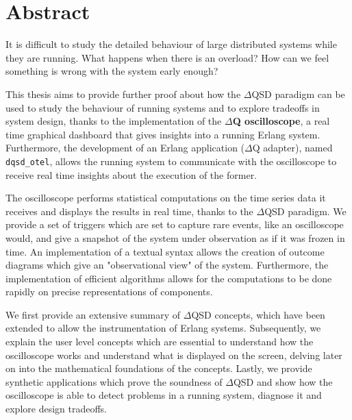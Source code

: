 \chapter*{Abstract}
    It is difficult to study the detailed behaviour of large distributed systems while they are running. What happens when there is an overload? How can we feel something is wrong with the system early enough?

    This thesis aims to provide further proof about how the $\Delta$QSD paradigm can be used to study the behaviour of running systems and to explore tradeoffs in system design, thanks to the implementation of the \textbf{$\Delta$Q oscilloscope}, a real time graphical dashboard that gives insights into a running Erlang system. Furthermore, the development of an Erlang application ($\Delta$Q adapter), named \texttt{dqsd\_otel}, allows the running system to communicate with the oscilloscope to receive real time insights about the execution of the former.
    
    The oscilloscope performs statistical computations on the time series data it receives and displays the results in real time, thanks to the $\Delta$QSD paradigm. We provide a set of triggers which are set to capture rare events, like an oscilloscope would, and give a snapshot of the system under observation as if it was frozen in time. An implementation of a textual syntax allows the creation of outcome diagrams which give an "observational view" of the system. Furthermore, the implementation of efficient algorithms allows for the computations to be done rapidly on precise representations of components.

    We first provide an extensive summary of $\Delta$QSD concepts, which have been extended to allow the instrumentation of Erlang systems. Subsequently, we explain the user level concepts which are essential to understand how  the oscilloscope works and understand what is displayed on the screen, delving later on into the mathematical foundations of the concepts. Lastly, we provide synthetic applications which prove the soundness of $\Delta$QSD and show how the oscilloscope is able to detect problems in a running system, diagnose it and explore design tradeoffs.



